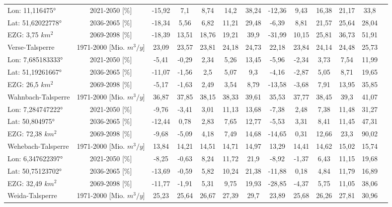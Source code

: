 \begin{longtable}{@{\extracolsep{\fill}}lc|ccccc||cccccc}
\cline{2-13} 
Lon: 11,116475° & 2021-2050 [\%]  & -15,92 & 7,1 & 8,74 & 14,2 & 38,24 & -12,36 & 9,43 & 16,38 & 21,17 & 33,8 & \\ 
Lat: 51,62022778° & 2036-2065 [\%]  & -18,34 & 5,56 & 6,82 & 11,21 & 29,48 & -6,39 & 8,81 & 21,57 & 25,64 & 28,04 & \\ 
EZG: 3,75 $km^2$ & 2069-2098 [\%]  & -18,39 & 13,51 & 18,76 & 19,21 & 39,9 & -31,99 & 10,15 & 25,81 & 36,73 & 51,91 & \\ 
\hline 
Verse-Talsperre & 1971-2000 [Mio. $m^3/y$]  & 23,09 & 23,57 & 23,81 & 24,18 & 24,73 & 22,18 & 23,84 & 24,14 & 24,48 & 25,73 & \\ 
\cline{2-13} 
Lon: 7,685183333° & 2021-2050 [\%]  & -5,41 & -0,29 & 2,34 & 5,26 & 13,45 & -5,96 & -2,34 & 3,73 & 7,54 & 11,99 & \\ 
Lat: 51,19261667° & 2036-2065 [\%]  & -11,07 & -1,56 & 2,5 & 5,07 & 9,3 & -4,16 & -2,87 & 5,05 & 8,71 & 19,65 & \\ 
EZG: 26,5 $km^2$ & 2069-2098 [\%]  & -5,17 & -1,63 & 2,49 & 3,54 & 8,79 & -13,58 & -3,68 & 7,91 & 13,95 & 35,85 & \\ 
\hline 
Wahnbach-Talsperre & 1971-2000 [Mio. $m^3/y$]  & 36,87 & 37,85 & 38,15 & 38,33 & 39,61 & 35,53 & 37,77 & 38,45 & 39,3 & 41,07 & \\ 
\cline{2-13} 
Lon: 7,284747222° & 2021-2050 [\%]  & -9,76 & -3,41 & 3,01 & 11,13 & 13,68 & -7,38 & 2,48 & 7,38 & 11,48 & 31,27 & \\ 
Lat: 50,804975° & 2036-2065 [\%]  & -12,44 & 0,78 & 2,83 & 7,65 & 12,77 & -5,53 & 3,31 & 8,41 & 11,45 & 47,31 & \\ 
EZG: 72,38 $km^2$ & 2069-2098 [\%]  & -9,68 & -5,09 & 4,18 & 7,49 & 14,68 & -14,65 & 0,31 & 12,66 & 23,3 & 90,02 & \\ 
\hline 
Wehebach-Talsperre & 1971-2000 [Mio. $m^3/y$]  & 13,84 & 14,21 & 14,51 & 14,71 & 14,97 & 13,29 & 14,41 & 14,62 & 15,02 & 15,74 & \\ 
\cline{2-13} 
Lon: 6,347622397° & 2021-2050 [\%]  & -8,25 & -0,63 & 8,24 & 11,72 & 21,9 & -8,92 & -1,37 & 6,43 & 11,15 & 19,68 & \\ 
Lat: 50,75123702° & 2036-2065 [\%]  & -13,69 & -0,59 & 5,82 & 10,24 & 21,38 & -11,88 & 0,18 & 4,84 & 11,79 & 16,89 & \\ 
EZG: 32,49 $km^2$ & 2069-2098 [\%]  & -11,77 & -1,91 & 5,31 & 9,75 & 19,93 & -28,85 & -4,37 & 5,75 & 11,05 & 38,06 & \\ 
\hline 
Weida-Talsperre & 1971-2000 [Mio. $m^3/y$]  & 25,23 & 25,64 & 26,67 & 27,39 & 29,7 & 23,89 & 25,68 & 26,26 & 27,81 & 30,96 & \\ 

\end{longtable}
